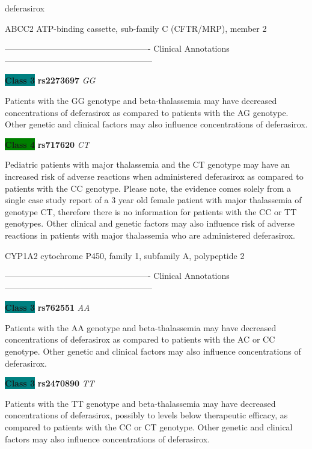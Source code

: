 \documentclass{resume} %
\begin{document}
\begin{rSection}{ deferasirox }
\begin{rSubsection}{ ABCC2 }{ ATP-binding cassette, sub-family C (CFTR/MRP), member 2 }{}{}
\item[] ---------------------------------------------------- Clinical Annotations -----------------------------------------------------\newline
\item \textbf{\colorbox{teal} {Class 3}} \textbf{ rs2273697 } \textit{ GG }
\item[] Patients with the GG genotype and beta-thalassemia may have decreased concentrations of deferasirox as compared to patients with the AG genotype. Other genetic and clinical factors may also influence concentrations of deferasirox.\item \textbf{\colorbox{green} {Class 4}} \textbf{ rs717620 } \textit{ CT }
\item[] Pediatric patients with major thalassemia and the CT genotype may have an increased risk of adverse reactions when administered deferasirox as compared to patients with the CC genotype. Please note, the evidence comes solely from a single case study report of a 3 year old female patient with major thalassemia of genotype CT, therefore there is no information for patients with the CC or TT genotypes. Other clinical and genetic factors may also influence risk of adverse reactions in patients with major thalassemia who are administered deferasirox.
\end{rSubsection}\begin{rSubsection}{ CYP1A2 }{ cytochrome P450, family 1, subfamily A, polypeptide 2 }{}{}
\item[]

\item[] ---------------------------------------------------- Clinical Annotations -----------------------------------------------------\newline
\item \textbf{\colorbox{teal} {Class 3}} \textbf{ rs762551 } \textit{ AA }
\item[] Patients with the AA genotype and beta-thalassemia may have decreased concentrations of deferasirox as compared to patients with the AC or CC genotype. Other genetic and clinical factors may also influence concentrations of deferasirox.\item \textbf{\colorbox{teal} {Class 3}} \textbf{ rs2470890 } \textit{ TT }
\item[] Patients with the TT genotype and beta-thalassemia may have decreased concentrations of deferasirox, possibly to levels below therapeutic efficacy, as compared to patients with the CC or CT genotype. Other genetic and clinical factors may also influence concentrations of deferasirox.
\end{rSubsection}


\end{rSection}
\end{document}
